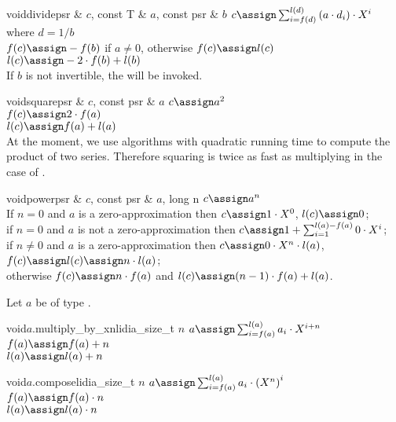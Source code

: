 \begin{fcode}{void}{divide}{psr & $c$, const T & $a$, const psr & $b$}
  $c \assign \sum_{i=f(d)}^{l(d)} \left( a \cdot d_i \right) \cdot X^i$ where $d = 1/b $\\
  $f(c) \assign - f(b)$ if $a \neq 0$, otherwise $f(c) \assign l(c)$ \\
  $l(c) \assign - 2 \cdot f(b) + l(b)$ \\
  If $b$ is not invertible, the \LEH will be invoked.
\end{fcode}

\begin{fcode}{void}{square}{psr & $c$, const psr & $a$}
  $c \assign a^2$ \\
  $f(c) \assign 2 \cdot f(a)$ \\
  $l(c) \assign f(a) + l(a)$ \\
  At the moment, we use algorithms with quadratic running time to compute the product of two
  series.  Therefore squaring is twice as fast as multiplying in the case of
  .
\end{fcode}

\begin{fcode}{void}{power}{psr & $c$, const psr & $a$, long n}
  $c \assign a^n$ \\
  If $n = 0$ and $a$ is a zero-approximation then
  $c \assign 1 \cdot X^0$, $l(c) \assign 0$; \\
  if $n = 0$ and $a$ is not a zero-approximation then
  $c \assign 1 + \sum_{i=1}^{l(a)-f(a)} 0 \cdot X^i$; \\
  if $n \neq 0$ and $a$ is a zero-approximation then
  $c \assign 0 \cdot X^n \cdot l(a)$, $f(c) \assign l(c) \assign n \cdot l(a)$; \\
  otherwise $f(c) \assign n \cdot f(a)$ and $l(c) \assign (n-1) \cdot f(a) + l(a)$.
\end{fcode}

Let $a$ be of type .

\begin{fcode}{void}{$a$.multiply_by_xn}{lidia_size_t $n$}
  $a \assign \sum_{i=f(a)}^{l(a)} a_i \cdot X^{i+n}$ \\
  $f(a) \assign f(a) + n$ \\
  $l(a) \assign l(a) + n$
\end{fcode}

\begin{fcode}{void}{$a$.compose}{lidia_size_t $n$}
  $a \assign \sum_{i=f(a)}^{l(a)} a_i \cdot \left(X^n\right)^i$ \\
  $f(a) \assign f(a) \cdot n$ \\
  $l(a) \assign l(a) \cdot n$
\end{fcode}


